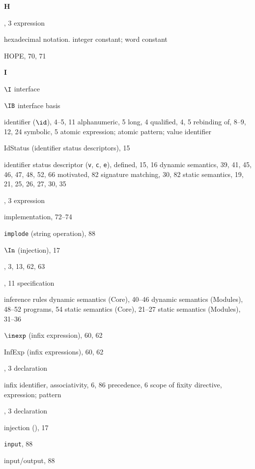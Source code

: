\begin{theindex}
\indexspace
\parbox{64mm}{\hfil{\large\bf H}\hfil}
\indexspace
\item \HANDLE, 3
\subitem \seealso expression
\item hexadecimal notation. \see integer constant; word constant
\item HOPE, 70, 71
\indexspace
\parbox{64mm}{\hfil{\large\bf I}\hfil}
\indexspace
\item $\I$ \see interface
\item $\IB$ \see interface basis
\item identifier ($\id$), 4--5, 11
\subitem alphanumeric, 5
\subitem long, 4 
\subitem qualified, 4, 5
\subitem rebinding of, 8--9, 12, 24
\subitem symbolic, 5
\subitem \seealso  atomic expression; atomic pattern; value identifier
\item IdStatus (identifier status descriptors), 15
\item identifier status descriptor ({\tt v}, {\tt c}, {\tt e}), 
\subitem defined, 15, 16
\subitem dynamic semantics, 39, 41, 45, 46, 47, 48, 52, 66
\subitem motivated, 82
\subitem signature matching, 30, 82
\subitem static semantics, 19, 21, 25, 26, 27, 30, 35
\item \IF, 3
\subitem \seealso expression
\item implementation, 72--74
\item {\tt implode} (string operation), 88
\item $\In$ (injection), 17
\item \IN, 3, 13, 62, 63
\item \INCLUDE, 11
\subitem \seealso specification
\item inference rules 
\subitem dynamic semantics (Core), 40--46
\subitem dynamic semantics (Modules), 48--52
\subitem programs, 54
\subitem static semantics (Core), 21--27
\subitem static semantics (Modules), 31--36
\item $\inexp$ (infix expression), 60, 62
\item InfExp (infix expressions), 60, 62
\item \INFIX, 3
\subitem \seealso declaration
\item infix identifier, \infixapplrefs
\subitem associativity, 6, 86
\subitem precedence, 6
\subitem scope of fixity directive, \scopefixityrefs
\subitem \seealso expression; pattern
\item \INFIXR, 3
\subitem \seealso declaration
\item injection (\In), 17
\item {\tt input}, 88
\item input/output, 88

\end{theindex}
